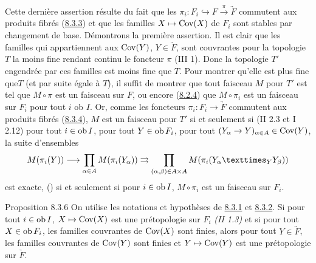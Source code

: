\documentclass[10pt]{../fichiers-configuration-latex/smfart}
\begin{document}
Cette dernière assertion résulte du fait que les $\pi_i : F_i
\hookrightarrow F \xrightarrow{\pi} \underrightarrow{F}$ commutent aux
produits fibrés (\hyperref[VI.prop8.3.3]{8.3.3}) et que les familles $X \mapsto \operatorname{Cov}(X)$ de
$F_i$ sont stables par changement de base. Démontrons la première
assertion. Il est clair que les familles qui appartiennent aux
$\operatorname{Cov}(Y)$, $Y \in \underrightarrow{F}$, sont couvrantes pour la topologie
$T$ la moins fine rendant continu le foncteur $\pi$ (III 1). Donc la
topologie $T'$ engendrée par ces familles est moins fine que $T$. Pour
montrer qu'elle est plus fine que\pageoriginale $T$ (et par suite
égale à $T$), il suffit de montrer que tout faisceau $M$ pour $T'$ est tel que $M \circ
\pi$ est un faisceau sur $F$, ou encore (\hyperref[VI.rem8.2.4]{8.2.4}) que $M \circ \pi_i$
est un faisceau sur $F_i$ pour tout $i$ ob $I$. Or, comme les foncteurs
$\pi_i : F_i \to \underrightarrow{F}$ commutent aux
produits fibrés (\hyperref[VI.lem8.3.4]{8.3.4}), $M$ est un faisceau pour $T'$ si et seulement
si (II 2.3 et I 2.12) pour tout $i \in \operatorname{ob} I$, pour tout $Y \in \operatorname{ob}
F_{i}$, pour tout $(Y_{\alpha} \to Y)_{\alpha \in A} \in
\Cov(Y)$, la suite d'ensembles
$$
M(\pi_i (Y)) \to \prod_{\alpha \in A} M (\pi_i (Y_{\alpha}))
\rightrightarrows \prod_{(\alpha, \beta) \in A \times A} M
(\pi_i (\fprod{Y_{\alpha}}{Y_{\beta}}{Y}))
$$
est exacte, \ie (\loccit) si et seulement si pour $i \in \operatorname{ob} I$, $M
\circ \pi_i$ est un faisceau sur $F_i$.

\begin{enonce*}{Proposition 8.3.6}
On utilise les notations et hypothèses de \hyperref[VI.subsubsec8.3.1]{8.3.1} et \hyperref[VI.subsubsec8.3.2]{8.3.2}. Si pour tout
$i \in \operatorname{ob} I$, $X \mapsto \operatorname{Cov}(X)$ est une prétopologie sur $F_i$ \emph{(II
1.3)} et si pour tout $X \in \operatorname{ob} F_i$, les familles couvrantes de
$\operatorname{Cov}(X)$ sont finies, alors pour tout $Y \in \underrightarrow{F}$, les
familles couvrantes de $\operatorname{Cov}(Y)$ sont finies et $Y \mapsto \operatorname{Cov}(Y)$ est
une prétopologie sur $\underrightarrow{F}$.
\end{enonce*}

\setcounter{subsubsection}{6}
\end{document}

